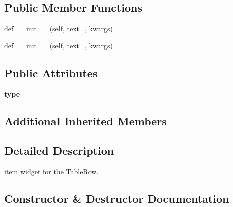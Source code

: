 \subsection*{Public Member Functions}
\begin{DoxyCompactItemize}
\item 
def \hyperlink{classremi_1_1gui_1_1TableItem_a9071ef2c5228dc089a37dd7209144dcc}{\+\_\+\+\_\+init\+\_\+\+\_\+} (self, text=\textquotesingle{}\textquotesingle{}, kwargs)
\item 
def \hyperlink{classremi_1_1gui_1_1TableItem_a9071ef2c5228dc089a37dd7209144dcc}{\+\_\+\+\_\+init\+\_\+\+\_\+} (self, text=\textquotesingle{}\textquotesingle{}, kwargs)
\end{DoxyCompactItemize}
\subsection*{Public Attributes}
\begin{DoxyCompactItemize}
\item 
{\bfseries type}\hypertarget{classremi_1_1gui_1_1TableItem_ab70c10a52f905d6e699830f5a60901ce}{}\label{classremi_1_1gui_1_1TableItem_ab70c10a52f905d6e699830f5a60901ce}

\end{DoxyCompactItemize}
\subsection*{Additional Inherited Members}


\subsection{Detailed Description}
\begin{DoxyVerb}item widget for the TableRow.\end{DoxyVerb}
 

\subsection{Constructor \& Destructor Documentation}
